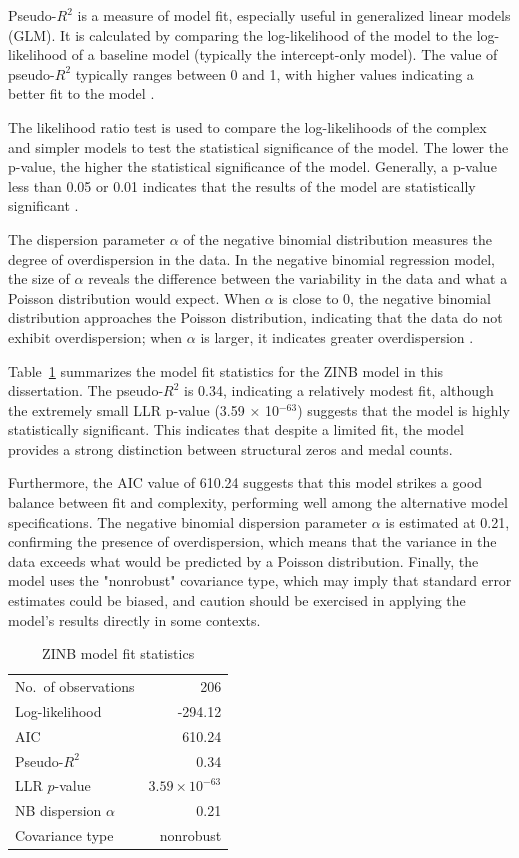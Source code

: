 \documentclass[11pt,twoside]{article}
\numberwithin{Theorem}{section}
\numberwithin{Definition}{section}
\numberwithin{Lemma}{section}
\numberwithin{Algorithm}{section}
\numberwithin{equation}{section}
\begin{document}
Pseudo-\( R^2 \) is a measure of model fit, especially useful in generalized linear models (GLM). It is calculated by comparing the log-likelihood of the model to the log-likelihood of a baseline model (typically the intercept-only model). The value of pseudo-\( R^2 \) typically ranges between 0 and 1, with higher values indicating a better fit to the model \cite{McFadden1974}.

The likelihood ratio test is used to compare the log-likelihoods of the complex and simpler models to test the statistical significance of the model. The lower the p-value, the higher the statistical significance of the model. Generally, a p-value less than 0.05 or 0.01 indicates that the results of the model are statistically significant \cite{Wilks1938}.

The dispersion parameter \(\alpha\) of the negative binomial distribution measures the degree of overdispersion in the data. In the negative binomial regression model, the size of \(\alpha\) reveals the difference between the variability in the data and what a Poisson distribution would expect. When \(\alpha\) is close to 0, the negative binomial distribution approaches the Poisson distribution, indicating that the data do not exhibit overdispersion; when \(\alpha\) is larger, it indicates greater overdispersion \cite{Nelder1972}.


Table~\ref{tab:zinb_fit} summarizes the model fit statistics for the ZINB model in this dissertation. The pseudo-$R^2$ is 0.34, indicating a relatively modest fit, although the extremely small LLR p-value (3.59 × 10$^{-63}$) suggests that the model is highly statistically significant. This indicates that despite a limited fit, the model provides a strong distinction between structural zeros and medal counts.

Furthermore, the AIC value of 610.24 suggests that this model strikes a good balance between fit and complexity, performing well among the alternative model specifications. The negative binomial dispersion parameter $\alpha$ is estimated at 0.21, confirming the presence of overdispersion, which means that the variance in the data exceeds what would be predicted by a Poisson distribution. Finally, the model uses the "nonrobust" covariance type, which may imply that standard error estimates could be biased, and caution should be exercised in applying the model's results directly in some contexts.

\begin{table}[t]
\centering
\caption{ZINB model fit statistics}
\label{tab:zinb_fit}
\begin{tabular}{l r}
\toprule
No.\ of observations & 206 \\
Log-likelihood & -294.12 \\
AIC & 610.24 \\
Pseudo-$R^2$ & 0.34 \\
LLR $p$-value & $3.59\times 10^{-63}$ \\
NB dispersion $\alpha$ & 0.21 \\
Covariance type & nonrobust \\
\bottomrule
\end{tabular}
\end{table}
\end{document}
